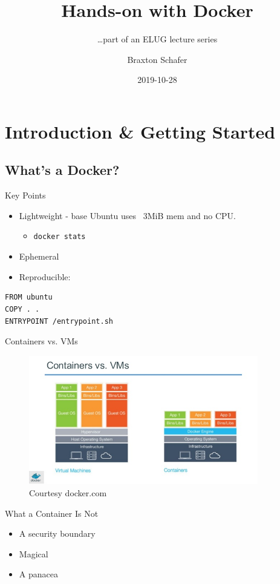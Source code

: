 \documentclass{beamer}
\title[Docker 101]{Hands-on with Docker}
\subtitle{\ldots part of an ELUG lecture series}
\author[B. Schafer]{Braxton Schafer} %
\date{2019-10-28} %
\institute[Epic]{Epic - CaTS \\ Unix Engineer}
\begin{document}
\maketitle
\addtocounter{framenumber}{-1} %

\section{Introduction \& Getting Started}
\subsection{What's a Docker?}
\begin{frame}[fragile]{Key Points}
\begin{itemize}
    \item Lightweight - base Ubuntu uses ~3MiB mem and no CPU.
    \begin{itemize}
    \item \texttt{docker stats}
    \end{itemize}
    \item Ephemeral
    \item Reproducible:
\end{itemize}
\begin{lstlisting}
FROM ubuntu
COPY . .
ENTRYPOINT /entrypoint.sh
\end{lstlisting}
\end{frame}
\begin{frame}{Containers vs. VMs}

\begin{figure}
\centering
\includegraphics[width=10cm]{Pictures/container-vs-vms.jpg}
\caption{Courtesy docker.com}
\end{figure}

\end{frame}

\begin{frame}{What a Container Is Not}
   \begin{itemize}
       \item A security boundary
       \item Magical
       \item A panacea
   \end{itemize}{} 
\end{frame}
\end{document}
